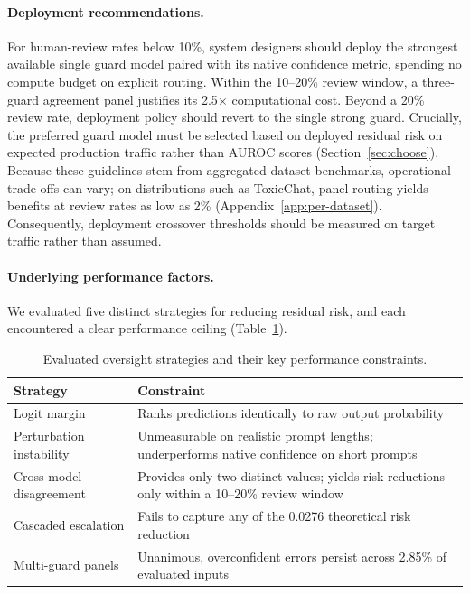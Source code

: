 \documentclass[11pt]{article}
\begin{document}
\paragraph{Deployment recommendations.} For human-review rates below 10\%, system designers should deploy the strongest available single guard model paired with its native confidence metric, spending no compute budget on explicit routing. Within the 10--20\% review window, a three-guard agreement panel justifies its 2.5$\times$ computational cost. Beyond a 20\% review rate, deployment policy should revert to the single strong guard. Crucially, the preferred guard model must be selected based on deployed residual risk on expected production traffic rather than AUROC scores (Section~\ref{sec:choose}). Because these guidelines stem from aggregated dataset benchmarks, operational trade-offs can vary; on distributions such as ToxicChat, panel routing yields benefits at review rates as low as 2\% (Appendix~\ref{app:per-dataset}). Consequently, deployment crossover thresholds should be measured on target traffic rather than assumed.

\paragraph{Underlying performance factors.} We evaluated five distinct strategies for reducing residual risk, and each encountered a clear performance ceiling (Table~\ref{tab:routes}).

\begin{table}[ht]
\centering
\small
\caption{Evaluated oversight strategies and their key performance constraints.}
\label{tab:routes}
\begin{tabular}{lp{8.5cm}}
\toprule
Strategy & Constraint \\
\midrule
Logit margin & Ranks predictions identically to raw output probability \\
Perturbation instability & Unmeasurable on realistic prompt lengths; underperforms native confidence on short prompts \\
Cross-model disagreement & Provides only two distinct values; yields risk reductions only within a 10--20\% review window \\
Cascaded escalation & Fails to capture any of the 0.0276 theoretical risk reduction \\
Multi-guard panels & Unanimous, overconfident errors persist across 2.85\% of evaluated inputs \\
\bottomrule
\end{tabular}
\end{table}
\end{document}
